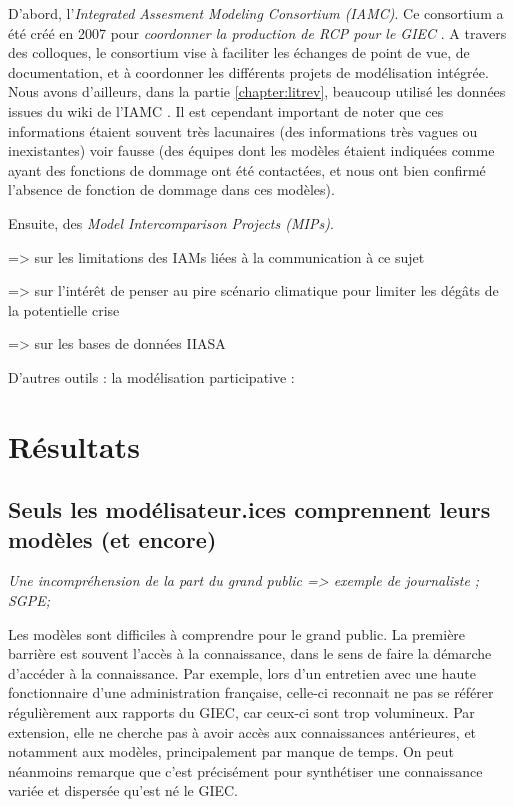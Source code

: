 D'abord, l'\emph{Integrated Assesment Modeling Consortium (IAMC)}. Ce consortium a été créé en 2007 pour \emph{coordonner la production de RCP pour le GIEC} \cite{cointe_organising_2019}. A travers des colloques, le consortium vise à faciliter les échanges de point de vue, de documentation, et à coordonner les différents projets de modélisation intégrée. Nous avons d'ailleurs, dans la partie \ref{chapter:litrev}, beaucoup utilisé les données issues du wiki de l'IAMC \cite{noauthor_models_nodate}. Il est cependant important de noter que ces informations étaient souvent très lacunaires (des informations très vagues ou inexistantes) voir fausse (des équipes dont les modèles étaient indiquées comme ayant des fonctions de dommage ont été contactées, et nous ont bien confirmé l'absence de fonction de dommage dans ces modèles). 

Ensuite, des \emph{Model Intercomparison Projects (MIPs)}.


\cite{keppo_exploring_2021} => sur les limitations des IAMs liées à la communication à ce sujet

\cite{davidson_climate_nodate} => sur l'intérêt de penser au pire scénario climatique pour limiter les dégâts de la potentielle crise


\cite{dekker_consensus_2022} => sur les bases de données IIASA
  
D'autres outils : la modélisation participative : 
\cite{etienne_modelisation_2010}






\section{Résultats}

\subsection{Seuls les modélisateur.ices comprennent leurs modèles (et encore)}

\textit{Une incompréhension de la part du grand public
=> exemple de journaliste ; SGPE; }

Les modèles sont difficiles à comprendre pour le grand public. La première barrière est souvent l'accès à la connaissance, dans le sens de faire la démarche d'accéder à la connaissance. 
Par exemple, lors d'un entretien avec une haute fonctionnaire d'une administration française, celle-ci reconnait ne pas se référer régulièrement aux rapports du GIEC, car ceux-ci sont trop volumineux. Par extension, elle ne cherche pas à avoir accès aux connaissances antérieures, et notamment aux modèles, principalement par manque de temps. On peut néanmoins remarque que c'est précisément pour synthétiser une connaissance variée et dispersée qu'est né le GIEC. \\

